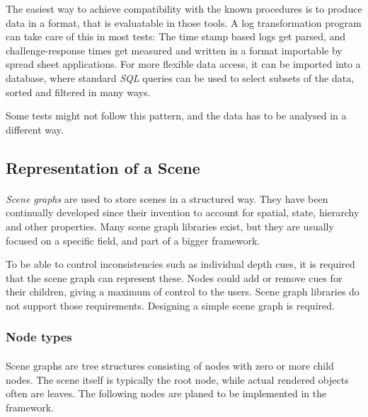 The easiest way to achieve compatibility with the known procedures is to produce data in a format, that is evaluatable in those tools. A log transformation program can take care of this in most tests: The time stamp based logs get parsed, and challenge-response times get measured and written in a format importable by spread sheet applications.
For more flexible data access, it can be imported into a database, where standard \textit{SQL} queries can be used to select subsets of the data, sorted and filtered in many ways.

Some tests might not follow this pattern, and the data has to be analysed in a different way.


\subsection{Representation of a Scene\label{sceneRep}}
\paragraph{}
\textit{Scene graphs} are used to store scenes in a structured way. They have been continually developed since their invention\cite{scenegraph} to account for spatial, state, hierarchy and other properties.
Many scene graph libraries exist, but they are usually focused on a specific field, and part of a bigger framework.

To be able to control inconsistencies such as individual depth cues, it is required that the scene graph can represent these. Nodes could add or remove cues for their children, giving a maximum of control to the users. Scene graph libraries do not support those requirements. Designing a simple scene graph is required.

\subsubsection{Node types}
\paragraph{}
Scene graphs are tree structures consisting of nodes with zero or more child nodes. The scene itself is typically the root node, while actual rendered objects often are leaves. The following nodes are planed to be implemented in the framework.

